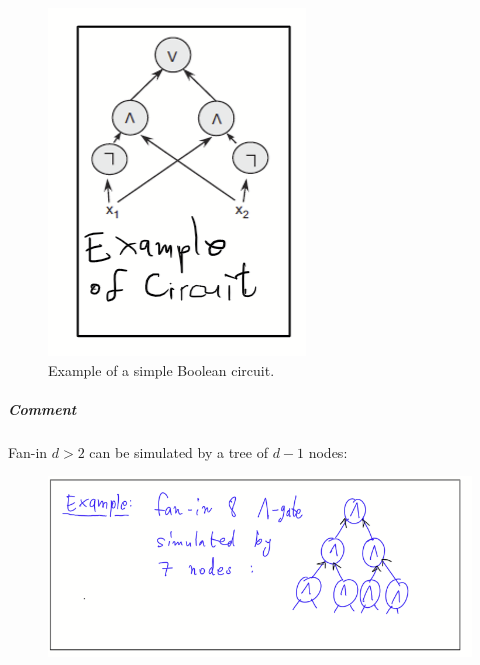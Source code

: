 \begin{figure}
\sidecaption
  \includegraphics[width=0.2\linewidth]{images/Example-circuit.png}
    \caption{Example of a simple Boolean circuit.}
    \label{fig:enter-label}
\end{figure}

%

\subparagraph{Comment}
Fan-in $d>2$ 
can be simulated by a tree of $d-1 $ nodes: 
\begin{figure}[h]
    \centering
  \includegraphics[width=0.5\linewidth]{images/Example-tree-circuit.png}
    \label{fig:enter-label}
\end{figure}
 


\newpage 
 

\renewcommand{\thequestcounter}{\arabic{questcounter}} 
 
\newenvironment{myquestion}{%
    \refstepcounter{questcounter} %
    \begin{svgraybox}
    \noindent\textbf{Question~\thequestcounter:} %
    \end{svgraybox}}{%
    \par %
}
 
